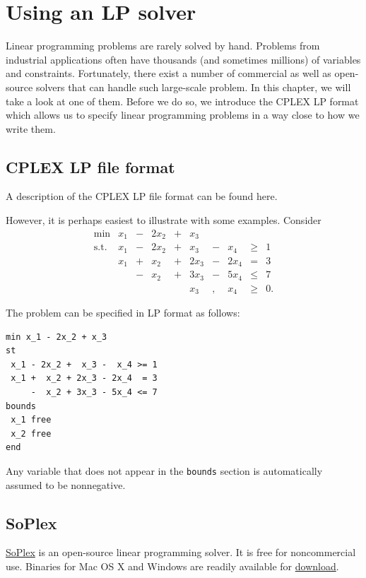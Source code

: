 \documentclass[]{book}
\theoremstyle{definition}
\theoremstyle{definition}
\theoremstyle{remark}
\begin{document}
\chapter{Using an LP solver}\label{using-an-lp-solver}

Linear programming problems are rarely solved by hand. Problems from
industrial applications often have thousands (and sometimes millions) of
variables and constraints. Fortunately, there exist a number of
commercial as well as open-source solvers that can handle such
large-scale problem. In this chapter, we will take a look at one of
them. Before we do so, we introduce the CPLEX LP format which allows us
to specify linear programming problems in a way close to how we write
them.

\section{CPLEX LP file format}\label{cplex-lp-file-format}

A description of the CPLEX LP file format can be found here.

However, it is perhaps easiest to illustrate with some examples.
Consider \[\begin{array}{rrcrcrcrcl}
\min & x_1 & - & 2x_2 & +& x_3 &   &  &  \\
\mbox{s.t.}
 & x_1 & - &  2x_2 & + &  x_3 & - & x_4  & \geq & 1  \\
  & x_1 & + &  x_2 & + & 2x_3 & - & 2x_4 &  = & 3  \\
 &  & - &  x_2 & + & 3 x_3 & - & 5x_4  & \leq & 7  \\
   &  &  & & & x_3 & , & x_4 & \geq & 0.
\end{array}\]

The problem can be specified in LP format as follows:

\begin{verbatim}
min x_1 - 2x_2 + x_3
st
 x_1 - 2x_2 +  x_3 -  x_4 >= 1
 x_1 +  x_2 + 2x_3 - 2x_4  = 3
     -  x_2 + 3x_3 - 5x_4 <= 7
bounds
 x_1 free
 x_2 free
end
\end{verbatim}

Any variable that does not appear in the \texttt{bounds} section is
automatically assumed to be nonnegative.

\section{SoPlex}\label{soplex}

\href{http://soplex.zib.de/}{SoPlex} is an open-source linear
programming solver. It is free for noncommercial use.
Binaries for Mac OS X and Windows are readily available for
\href{http://soplex.zib.de/\#download}{download}.
\end{document}
